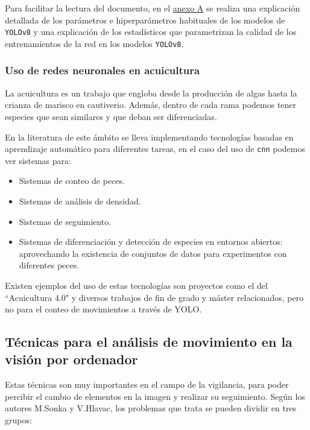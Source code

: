 Para facilitar la lectura del documento, en el \hyperref[subsec:A]{anexo A} se realiza una explicación detallada de los parámetros e hiperparámetros habituales de los modelos de \texttt{YOLOv8} y una explicación 
de los estadísticos que parametrizan la calidad de los entrenamientos de la red en los modelos \texttt{YOLOv8}.


\subsubsection{Uso de redes neuronales en acuicultura}

La acuicultura es un trabajo que engloba desde la producción de algas hasta la crianza de marisco en cautiverio. Además, dentro de cada rama podemos tener especies que sean similares y que deban ser diferenciadas.

En la literatura de este ámbito se lleva implementando tecnologías basadas en aprendizaje automático para diferentes tareas, en el caso del uso de \texttt{\acrshort{cnn}} podemos ver sistemas para:
\begin{itemize}
    \item Sistemas de conteo de peces\cite{castillomoralSistemaConteoPeces2022}.
    \item Sistemas de análisis de densidad.
    \item Sistemas de seguimiento\cite{leeDetectionCatfishActivity2024}.
    \item Sistemas de diferenciación y detección de especies en entornos abiertos\cite{xiaSituSeaCucumber2018}\cite{ladeAutomatedFishSpecies2023}: aprovechando la existencia de conjuntos de datos
    \cite{ulucanLargeScaleDatasetFish2020} para experimentos con diferentes peces.
\end{itemize}

Existen ejemplos del uso de estas tecnologías son proyectos como el del  ``Acuicultura 4.0"\cite{Acuicultura} y diversos trabajos de fin de grado y máster relacionados, pero no para el conteo de movimientos a través de YOLO.

\clearpage
\subsection{Técnicas para el análisis de movimiento en la visión por ordenador}

Estas técnicas son muy importantes en el campo de la vigilancia, para poder percibir el cambio de elementos en la imagen y realizar su seguimiento. Según los autores M.Sonka y V.Hlavac\cite{sonkaImageProcessingAnalysis2013}, los problemas que 
trata se pueden dividir en tres grupos:

